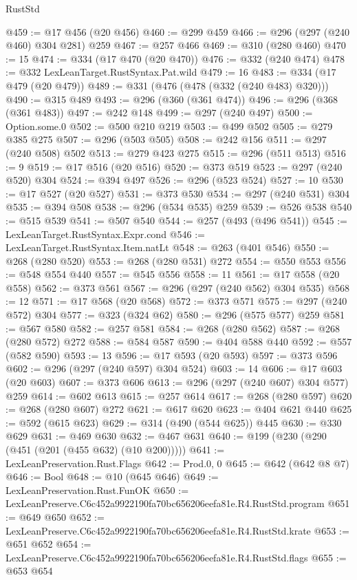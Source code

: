 \begin{lexlean}{RustStd}
\begin{coremodule}
@459 := @17 @456 (@20 @456)
@460 := @299 @459
@466 := @296 (@297 (@240 @460) @304 @281) @259
@467 := @257 @466
@469 := @310 (@280 @460)
@470 := 15
@474 := @334 (@17 @470 (@20 @470))
@476 := @332 (@240 @474)
@478 := @332 LexLeanTarget.RustSyntax.Pat.wild
@479 := 16
@483 := @334 (@17 @479 (@20 @479))
@489 := @331 (@476 (@478 (@332 (@240 @483) @320)))
@490 := @315 @489
@493 := @296 (@360 (@361 @474))
@496 := @296 (@368 (@361 @483))
@497 := @242 @148
@499 := @297 (@240 @497)
@500 := Option.some.{0}
@502 := @500 @210 @219
@503 := @499 @502
@505 := @279 @385 @275
@507 := @296 (@503 @505)
@508 := @242 @156
@511 := @297 (@240 @508) @502
@513 := @279 @423 @275
@515 := @296 (@511 @513)
@516 := 9
@519 := @17 @516 (@20 @516)
@520 := @373 @519
@523 := @297 (@240 @520) @304
@524 := @394 @497
@526 := @296 (@523 @524)
@527 := 10
@530 := @17 @527 (@20 @527)
@531 := @373 @530
@534 := @297 (@240 @531) @304
@535 := @394 @508
@538 := @296 (@534 @535) @259
@539 := @526 @538
@540 := @515 @539
@541 := @507 @540
@544 := @257 (@493 (@496 @541))
@545 := LexLeanTarget.RustSyntax.Expr.cond
@546 := LexLeanTarget.RustSyntax.Item.natLt
@548 := @263 (@401 @546)
@550 := @268 (@280 @520)
@553 := @268 (@280 @531) @272
@554 := @550 @553
@556 := @548 @554 @440
@557 := @545 @556
@558 := 11
@561 := @17 @558 (@20 @558)
@562 := @373 @561
@567 := @296 (@297 (@240 @562) @304 @535)
@568 := 12
@571 := @17 @568 (@20 @568)
@572 := @373 @571
@575 := @297 (@240 @572) @304
@577 := @323 (@324 @62)
@580 := @296 (@575 @577) @259
@581 := @567 @580
@582 := @257 @581
@584 := @268 (@280 @562)
@587 := @268 (@280 @572) @272
@588 := @584 @587
@590 := @404 @588 @440
@592 := @557 (@582 @590)
@593 := 13
@596 := @17 @593 (@20 @593)
@597 := @373 @596
@602 := @296 (@297 (@240 @597) @304 @524)
@603 := 14
@606 := @17 @603 (@20 @603)
@607 := @373 @606
@613 := @296 (@297 (@240 @607) @304 @577) @259
@614 := @602 @613
@615 := @257 @614
@617 := @268 (@280 @597)
@620 := @268 (@280 @607) @272
@621 := @617 @620
@623 := @404 @621 @440
@625 := @592 (@615 @623)
@629 := @314 (@490 (@544 @625)) @445
@630 := @330 @629
@631 := @469 @630
@632 := @467 @631
@640 := @199 (@230 (@290 (@451 (@201 (@455 @632) (@10 @200)))))
@641 := LexLeanPreservation.Rust.Flags
@642 := Prod.{0, 0}
@645 := @642 (@642 @8 @7)
@646 := Bool
@648 := @10 (@645 @646)
@649 := LexLeanPreservation.Rust.FunOK
@650 := LexLeanPreserve.C6c452a9922190fa70bc656206eefa81e.R4.RustStd.program
@651 := @649 @650
@652 := LexLeanPreserve.C6c452a9922190fa70bc656206eefa81e.R4.RustStd.krate
@653 := @651 @652
@654 := LexLeanPreserve.C6c452a9922190fa70bc656206eefa81e.R4.RustStd.flags
@655 := @653 @654

\end{coremodule}
\end{lexlean}
